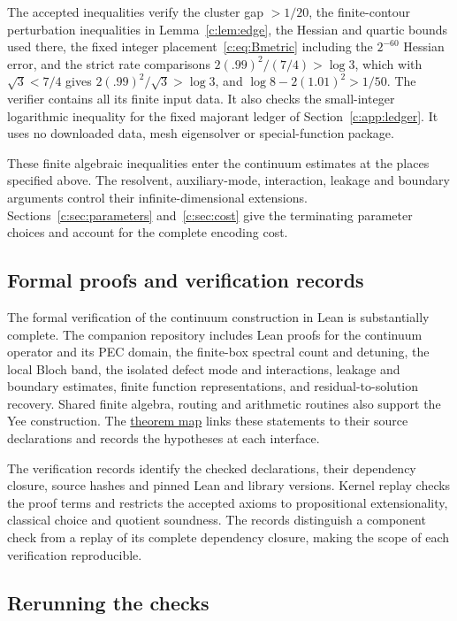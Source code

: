 The accepted inequalities verify the cluster gap $>1/20$, the
finite-contour perturbation inequalities in Lemma~\ref{c:lem:edge},
the Hessian and quartic bounds used there, the fixed integer
placement~\eqref{c:eq:Bmetric} including the $2^{-60}$ Hessian error,
and the strict rate comparisons
$2(.99)^2/(7/4)>\log3$, which with $\sqrt3<7/4$ gives
$2(.99)^2/\sqrt3>\log3$, and
$\log8-2(1.01)^2>1/50$. The verifier contains all its finite input
data. It also checks the small-integer logarithmic inequality for the
fixed majorant ledger of Section~\ref{c:app:ledger}. It uses no
downloaded data, mesh eigensolver or special-function package.

These finite algebraic inequalities enter the continuum estimates at the
places specified above. The resolvent, auxiliary-mode, interaction,
leakage and boundary arguments control their infinite-dimensional
extensions. Sections~\ref{c:sec:parameters} and~\ref{c:sec:cost} give the
terminating parameter choices and account for the complete encoding cost.

\subsection{Formal proofs and verification records}

The formal verification of the continuum construction in Lean is
substantially complete. The companion repository includes Lean proofs for
the continuum operator and its PEC domain, the finite-box spectral count and
detuning, the local Bloch band, the isolated defect mode and interactions,
leakage and boundary estimates, finite function representations, and
residual-to-solution recovery. Shared finite algebra, routing and
arithmetic routines also support the Yee construction. The
\href{https://github.com/yaugenst/maxwell-universality/blob/main/lean/proof-map.md}{theorem map}
links these statements to their source declarations and records the
hypotheses at each interface.

The verification records identify the checked declarations, their
dependency closure, source hashes and pinned Lean and library versions.
Kernel replay checks the proof terms and restricts the accepted axioms
to propositional extensionality, classical choice and quotient soundness.
The records distinguish a component check from a replay of its complete
dependency closure, making the scope of each verification reproducible.

\subsection{Rerunning the checks}

